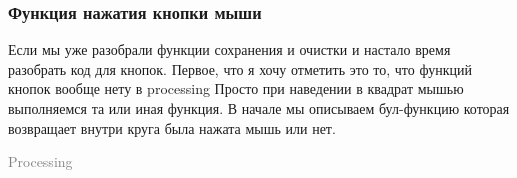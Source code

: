 \documentclass[a4paper, 12pt]{article}
\begin{document}
\subsubsection{Функция нажатия кнопки мыши}

Если мы уже разобрали функции сохранения и очистки и настало время разобрать
код для кнопок. Первое, что я хочу отметить это то, что функций кнопок вообще
нету в processing Просто при наведении в квадрат мышью выполняемся та или иная
функция. В начале мы описываем бул-функцию которая возвращает внутри круга была
нажата мышь или нет.

\begin{flushright}\begin{huge}\textcolor{grey}{Processing}\end{huge}\end{flushright}
\end{document}
